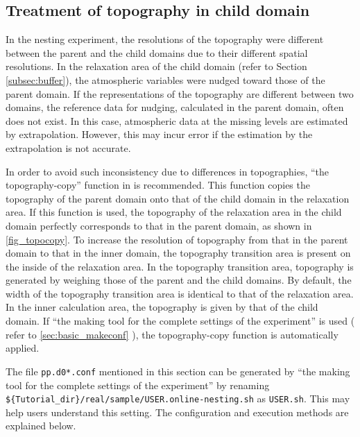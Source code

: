 \subsection{Treatment of topography in child domain} \label{subsec:nest_topo}
In the nesting experiment, the resolutions of the topography were different between the parent and the child domains due to their different spatial resolutions. In the relaxation area of the child domain (refer to Section \ref{subsec:buffer}), the atmospheric variables were nudged toward those of the parent domain. If the representations of the topography are different between two domains, the reference data for nudging, calculated in the parent domain, often does not exist. In this case, atmospheric data at the missing levels are estimated by extrapolation. However, this may incur error if the estimation by the extrapolation is not accurate.

In order to avoid such inconsistency due to differences in topographies, ``the topography-copy'' function in \scalerm is recommended. This function copies the topography of the parent domain onto that of the child domain in the relaxation area. If this function is used, the topography of the relaxation area in the child domain perfectly corresponds to that in the parent domain, as shown in \ref{fig_topocopy}. To increase the resolution of topography from that in the parent domain to that in the inner domain, the topography transition area is present on the inside of the relaxation area. In the topography transition area, topography is generated by weighing those of the parent and the child domains. By default, the width of the topography transition area is identical to that of the relaxation area. In the inner calculation area, the topography is given by that of the child domain. If ``the making tool for the complete settings of the experiment'' is used ( refer to \ref{sec:basic_makeconf} ), the topography-copy function is automatically applied.

The file \verb|pp.d0*.conf| mentioned in this section can be generated by  ``the making tool for the complete settings of the experiment'' by renaming \\ \verb|${Tutorial_dir}/real/sample/USER.online-nesting.sh| as \verb|USER.sh|. This may help users understand this setting. The configuration and execution methods are explained below.

